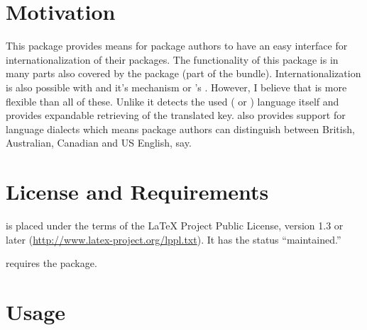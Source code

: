 \documentclass[DIV9,toc=index,toc=bib,numbers=noendperiod]{cnpkgdoc}
\begin{document}
\section{Motivation}
This package provides means for package authors to have an easy interface for
internationalization of their packages.  The functionality of this package is
in many parts also covered by the package  (part of the
 bundle).  Internationalization is also possible with
 and it's  mechanism or
\KOMAScript's .  However, I believe that \translations
is more flexible than all of these. Unlike  it detects the
used ( or ) language itself and provides
expandable retrieving of the translated key.  \translations also provides
support for language dialects which means package authors can distinguish
between British, Australian, Canadian and US English, say.

\section{License and Requirements}\label{sec:license}
\translations is placed under the terms of the \LaTeX{} Project Public License,
version 1.3 or later (\url{http://www.latex-project.org/lppl.txt}). It has the
status ``maintained.''

\translations requires the  package.

\section{Usage}
\end{document}
